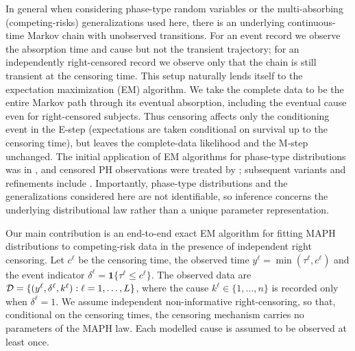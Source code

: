 \documentclass{article}
\newenvironment{rcrevision}{}{}
\newcommand{\aachg}[1]{#1}
\newcommand{\subchg}[1]{#1}
\begin{document}
\begin{rcrevision}
In general when considering phase-type random variables or the multi-absorbing (competing-risks) generalizations used here, there is an underlying continuous-time Markov chain with unobserved transitions. For an event record we observe the absorption time and cause but not the transient trajectory; for an independently right-censored record we observe only that the chain is still transient at the censoring time. This setup naturally lends itself to \aachg{the} expectation maximization (EM) \aachg{algorithm}. We take the complete \aachg{data} to be the entire Markov path through its eventual absorption, including the eventual cause even for \aachg{right-censored subjects}. Thus censoring \aachg{affects only} the conditioning event in the E-step \aachg{(expectations are taken conditional on survival up to the censoring time),} but leaves the complete-data likelihood and \aachg{the} M-step unchanged. The initial application of EM algorithms for phase-type distributions was in \citet{Asmussen1996FittingPD}, and censored PH observations were treated by \citet{Olsson_1996_censored}; subsequent variants and refinements include \citep{thummler_2006, okamura_2011, bladt_nielsen_2017}. Importantly, phase-type distributions and the generalizations considered here are not identifiable, so inference concerns the \aachg{underlying} distributional law rather than a unique parameter representation.
\end{rcrevision}

\begin{rcrevision}
Our main contribution is an end-to-end \subchg{exact} EM algorithm for \aachg{fitting MAPH distributions to competing-risk data in the presence of independent right censoring.} Let \aachg{$c^\ell$} be the censoring time, \aachg{the observed time} \aachg{$y^\ell=\min(\tau^\ell,c^\ell)$} and \aachg{the event indicator} \aachg{$\delta^\ell=\mathbf 1\{\tau^\ell\le c^\ell\}$}. The observed data are ${\cal D}=\{(y^\ell,\delta^\ell,k^\ell):\ell=1,\ldots,L\}$, where the cause $k^\ell\in\{1,\ldots,n\}$ is recorded only when $\delta^\ell=1$. We assume \aachg{independent} non-informative \aachg{right-}censoring\aachg{, so that,} conditional on the censoring times, the censoring mechanism carries no parameters of the MAPH law. \subchg{Each} modelled cause is assumed to \subchg{be observed} at least once.
\end{rcrevision}
\end{document}
